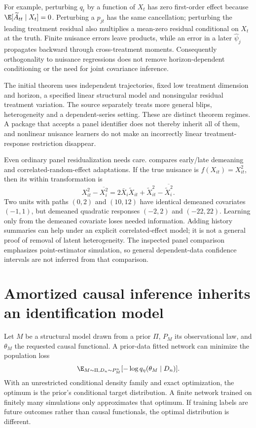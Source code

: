 For example, perturbing $q_t$ by a function of $X_t$ has zero first-order
effect because $\E[\widetilde A_{tt}\mid X_t]=0$. Perturbing a
$p_{jt}$ has the same cancellation; perturbing the leading treatment
residual also multiplies a mean-zero residual conditional on $X_t$ at
the truth. Finite nuisance errors leave products, while an error in a
later $\widehat\psi_j$ propagates backward through cross-treatment moments.
Consequently orthogonality to nuisance regressions does not remove
horizon-dependent conditioning or the need for joint covariance inference.

The initial theorem uses independent trajectories, fixed low treatment
dimension and horizon, a specified linear structural model and nonsingular
residual treatment variation. The source separately treats more general
blips, heterogeneity and a dependent-series setting. These are distinct
theorem regimes. A package that accepts a panel identifier does not thereby
inherit all of them, and nonlinear nuisance learners do not make an
incorrectly linear treatment-response restriction disappear.

Even ordinary panel residualization needs care.
\citet[Sections 2--4]{paneldml2024} compares early/late demeaning and
correlated-random-effect adaptations. If the true nuisance is
$f(X_{it})=X_{it}^2$, then its within transformation is
\[
 X_{it}^2-\overline{X_i^2}
 =2\bar X_i\widetilde X_{it}
   +\widetilde X_{it}^2-\overline{\widetilde X_i^2}.
\]
Two units with paths $(0,2)$ and $(10,12)$ have identical demeaned
covariates $(-1,1)$, but demeaned quadratic responses $(-2,2)$ and
$(-22,22)$. Learning only from the demeaned covariate loses needed
information. Adding history summaries can help under an explicit
correlated-effect model; it is not a general proof of removal of latent
heterogeneity. The inspected panel comparison emphasizes point-estimator
simulation, so general dependent-data confidence intervals are not inferred
from that comparison.

\section{Amortized causal inference inherits an identification model}
\label{r3:causal-fm}

Let $M$ be a structural model drawn from a prior $\Pi$, $P_M$ its
observational law, and $\theta_M$ the requested causal functional.
A prior-data fitted network can minimize the population loss
\[
 \E_{M\sim\Pi,D_n\sim P_M^n}
       [-\log q_\eta(\theta_M\mid D_n)].
\]
With an unrestricted conditional density family and exact optimization,
the optimum is the prior's conditional target distribution. A finite
network trained on finitely many simulations only approximates that
optimum. If training labels are future outcomes rather than causal
functionals, the optimal distribution is different.

